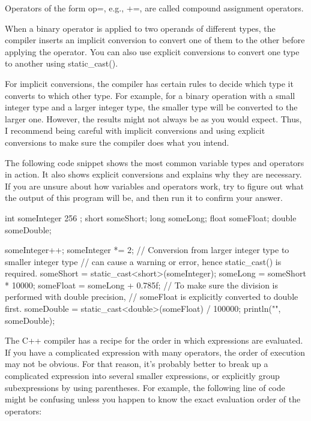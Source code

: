 Operators of the form op=, e.g., +=, are called compound assignment operators.

When a binary operator is applied to two operands of different types, the compiler inserts an implicit conversion to convert one of them to the other before applying the operator. You can also use explicit conversions to convert one type to another using static\_cast().

For implicit conversions, the compiler has certain rules to decide which type it converts to which other type. For example, for a binary operation with a small integer type and a larger integer type, the smaller type will be converted to the larger one. However, the results might not always be as you would expect. Thus, I recommend being careful with implicit conversions and using explicit conversions to make sure the compiler does what you intend.

The following code snippet shows the most common variable types and operators in action. It also shows explicit conversions and explains why they are necessary. If you are unsure about how variables and operators work, try to figure out what the output of this program will be, and then run it to confirm your answer.

\begin{cpp}
int someInteger { 256 };
short someShort;
long someLong;
float someFloat;
double someDouble;

someInteger++;
someInteger *= 2;
// Conversion from larger integer type to smaller integer type
// can cause a warning or error, hence static_cast() is required.
someShort = static_cast<short>(someInteger);
someLong = someShort * 10000;
someFloat = someLong + 0.785f;
// To make sure the division is performed with double precision,
// someFloat is explicitly converted to double first.
someDouble = static_cast<double>(someFloat) / 100000;
println("{}", someDouble);
\end{cpp}

The C++ compiler has a recipe for the order in which expressions are evaluated. If you have a complicated expression with many operators, the order of execution may not be obvious. For that reason, it’s probably better to break up a complicated expression into several smaller expressions, or explicitly group subexpressions by using parentheses. For example, the following line of code might be confusing unless you happen to know the exact evaluation order of the operators:


